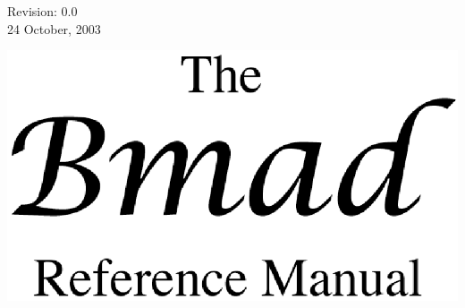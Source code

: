 \thispagestyle{empty}

\begin{flushright}
\large
  Revision: 0.0 \\
  24 October, 2003
\end{flushright}

\vfill

{
\begin{center}
\includegraphics{bmad_title.ps} \\
\end{center}
}

\vskip 1in
\vfill
\break